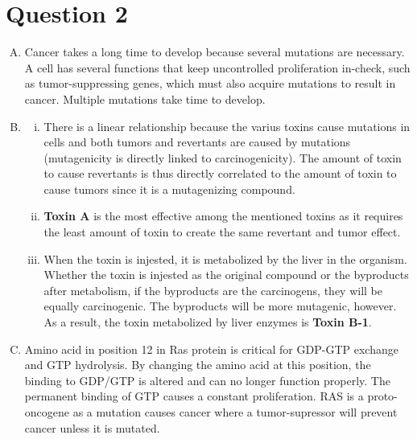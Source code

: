 \documentclass{article}
\begin{document}
\section*{ Question 2 }

\begin{enumerate}[A.]
    \item Cancer takes a long time to develop because several mutations are
        necessary. A cell has several functions that keep uncontrolled
        proliferation in-check, such as tumor-suppressing genes, which must also
        acquire mutations to result in cancer. Multiple mutations take time to
        develop.

    \item 
        \begin{enumerate}[i.]
            \item There is a linear relationship because the varius toxins cause
                mutations in cells and both tumors and revertants are caused by
                mutations (mutagenicity is directly linked to carcinogenicity).
                The amount of toxin to cause revertants is thus directly
                correlated to the amount of toxin to cause tumors since it is a
                mutagenizing compound.

            \item \textbf{Toxin A} is the most effective among the mentioned
                toxins as it requires the least amount of toxin to create the
                same revertant and tumor effect.

            \item When the toxin is injested, it is metabolized by the liver in
                the organism. Whether the toxin is injested as the original
                compound or the byproducts after metabolism, if the byproducts
                are the carcinogens, they will be equally carcinogenic. The
                byproducts will be more mutagenic, however. As a result, the
                toxin metabolized by liver enzymes is \textbf{Toxin B-1}.

        \end{enumerate}

    \item Amino acid in position 12 in Ras protein is critical for GDP-GTP
        exchange and GTP hydrolysis. By changing the amino acid at this
        position, the binding to GDP/GTP is altered and can no longer function
        properly. The permanent binding of GTP causes a constant proliferation.
        RAS is a proto-oncogene as a mutation causes cancer where a
        tumor-supressor will prevent cancer unless it is mutated.


\end{enumerate}
\end{document}
